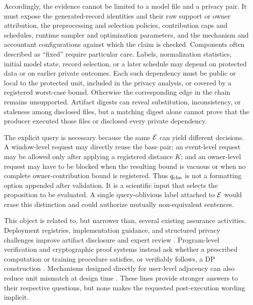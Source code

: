 Accordingly, the evidence cannot be limited to a model file and a privacy pair.
It must expose the generated-record identities and their raw support or owner
attribution, the preprocessing and selection policies, contribution caps and
schedules, runtime sampler and optimization parameters, and the mechanism and
accountant configurations against which the claim is checked.  Components often
described as ``fixed'' require particular care.  Labels, normalization statistics,
initial model state, record selection, or a later schedule may depend on protected
data or on earlier private outcomes.  Each such dependency must be public or local
to the protected unit, included in the privacy analysis, or covered by a registered
worst-case bound.  Otherwise the corresponding edge in the chain remains
unsupported.  Artifact digests can reveal substitution, inconsistency, or
staleness among disclosed files, but a matching digest alone cannot prove that the
producer executed those files or disclosed every private dependency.

The explicit query is necessary because the same \(\mathcal{E}\) can yield
different decisions.  A window-level request may directly reuse the base pair; an
event-level request may be allowed only after applying a registered distance
\(K\); and an owner-level request may have to be blocked when the resulting bound
is vacuous or when no complete owner-contribution bound is registered.  Thus
\(q_{\mathrm{clm}}\) is not a formatting option appended after validation.  It is a
scientific input that selects the proposition to be evaluated.  A single
query-oblivious label attached to \(\mathcal{E}\) would erase this distinction
and could authorize mutually non-equivalent sentences.

This object is related to, but narrower than, several existing assurance
activities.  Deployment registries, implementation guidance, and structured
privacy challenges improve artifact disclosure and expert review
\cite{ridgeway2021challenge,kifer2020guidelines,altman2025registry}.  Program-level
verification and cryptographic proof systems instead ask whether a prescribed
computation or training procedure satisfies, or verifiably follows, a DP
construction \cite{narayan2015verifiable,shamsabadi2024confidential}.  Mechanisms
designed directly for user-level adjacency can also reduce unit mismatch at design
time \cite{chua2024mind}.  These lines provide stronger answers to their respective
questions, but none makes the requested post-execution wording implicit.

